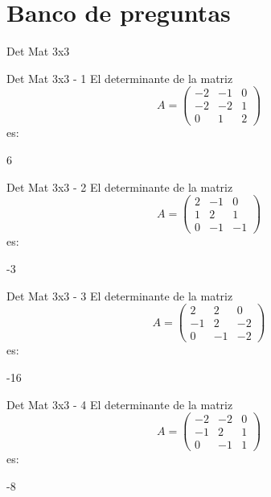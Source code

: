 \documentclass[a4,11pt]{aleph-notas}
\begin{document}


\section{Banco de preguntas}

\begin{quiz}{Det Mat 3x3}

\begin{numerical}[tolerance=0]%
    {Det Mat 3x3 - 1}
    El determinante de la matriz
    \[
        A = \begin{pmatrix} -2 & -1 & 0 \\ -2 & -2 & 1 \\ 0 & 1 & 2 \end{pmatrix}
    \]
    es:
    \item[] 6
\end{numerical}

\begin{numerical}[tolerance=0]%
    {Det Mat 3x3 - 2}
    El determinante de la matriz
    \[
        A = \begin{pmatrix} 2 & -1 & 0 \\ 1 & 2 & 1 \\ 0 & -1 & -1 \end{pmatrix}
    \]
    es:
    \item[] -3
\end{numerical}

\begin{numerical}[tolerance=0]%
    {Det Mat 3x3 - 3}
    El determinante de la matriz
    \[
        A = \begin{pmatrix} 2 & 2 & 0 \\ -1 & 2 & -2 \\ 0 & -1 & -2 \end{pmatrix}
    \]
    es:
    \item[] -16
\end{numerical}

\begin{numerical}[tolerance=0]%
    {Det Mat 3x3 - 4}
    El determinante de la matriz
    \[
        A = \begin{pmatrix} -2 & -2 & 0 \\ -1 & 2 & 1 \\ 0 & -1 & 1 \end{pmatrix}
    \]
    es:
    \item[] -8
\end{numerical}


\end{quiz}
\end{document}
